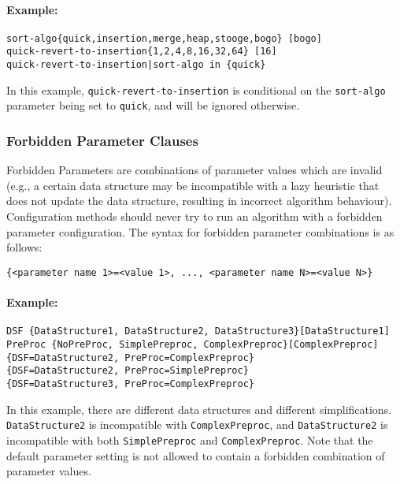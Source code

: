 \documentclass[manual.tex]{subfiles}
\begin{document}
\paragraph{Example:}

\begin{verbatim}
sort-algo{quick,insertion,merge,heap,stooge,bogo} [bogo]
quick-revert-to-insertion{1,2,4,8,16,32,64} [16]
quick-revert-to-insertion|sort-algo in {quick}
\end{verbatim}
In this example, \texttt{quick-revert-to-insertion} is conditional on the \texttt{sort-algo} parameter being set to \texttt{quick}, and will be ignored otherwise.


\subsubsection{Forbidden Parameter Clauses}

Forbidden Parameters are combinations of parameter values which are invalid (e.g., a certain data structure may be incompatible with a lazy heuristic that does not update the data structure, resulting in incorrect algorithm behaviour).
%
Configuration methods should never try to run an algorithm with a forbidden parameter configuration. 
%
The syntax for forbidden parameter combinations is as follows:

\begin{verbatim}
{<parameter name 1>=<value 1>, ..., <parameter name N>=<value N>}
\end{verbatim}

\paragraph{Example:}
\begin{verbatim}
DSF {DataStructure1, DataStructure2, DataStructure3}[DataStructure1]
PreProc {NoPreProc, SimplePreproc, ComplexPreproc}[ComplexPreproc]
{DSF=DataStructure2, PreProc=ComplexPreproc}
{DSF=DataStructure2, PreProc=SimplePreproc}
{DSF=DataStructure3, PreProc=ComplexPreproc}
\end{verbatim}

In this example, there are different data structures and different simplifications.
\texttt{DataStructure2} is incompatible with \texttt{ComplexPreproc}, and 
\texttt{DataStructure2} is incompatible with both \texttt{SimplePreproc} and \texttt{ComplexPreproc}.
Note that the default parameter setting is not allowed to contain a forbidden combination of parameter values.
\end{document}
